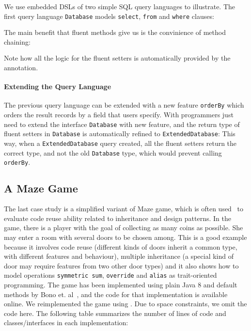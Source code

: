\noindent We use embedded DSLs of two simple SQL query languages to illustrate.
The first query language \texttt{Database}  models
\texttt{select}, \texttt{from} and \texttt{where} clauses:

\noindent The main benefit that fluent methods give
us is the convinience of method chaining:


\noindent Note how all the logic for the fluent setters is automatically provided by the \mixin annotation. 

\paragraph{Extending the Query Language} The previous query language can be extended with a new feature
\texttt{orderBy} which orders the result records by a field that users
specify. With \mixin programmers just need to extend the interface \texttt{Database} with new
feature, and the return type of fluent setters in
\texttt{Database} is automatically refined to \texttt{ExtendedDatabase}:
This way, when a \texttt{ExtendedDatabase} query created, 
all the fluent setters return the correct type, and not the old \texttt{Database} type, which would prevent calling 
\texttt{orderBy}.


\subsection{A Maze Game}
The last case study is a simplified variant of Maze game, which is often
used~\cite{gof,bono14} 
to evaluate code reuse ability related to inheritance and design
patterns. In the game, there is a player with the goal of collecting
as many coins as possible. She may enter a room with several doors to
be chosen among. This is a good example because it involves code reuse
(different kinds of doors inherit a common type, with different
features and behaviour), multiple inheritance (a special kind of door
may require features from two other door types) and it also shows how
to model operations \texttt{symmetric sum}, \texttt{override} and
\texttt{alias} as trait-oriented programming. The game has been
implemented using plain Java 8 and default methods by Bono
et. al~\cite{bono14}, and the code for that implementation is
available online. We reimplemented the game using \mixin. Due to space
constraints, we omit the code here. The following table summarizes
the number of lines of code and classes/interfaces in each implementation:

